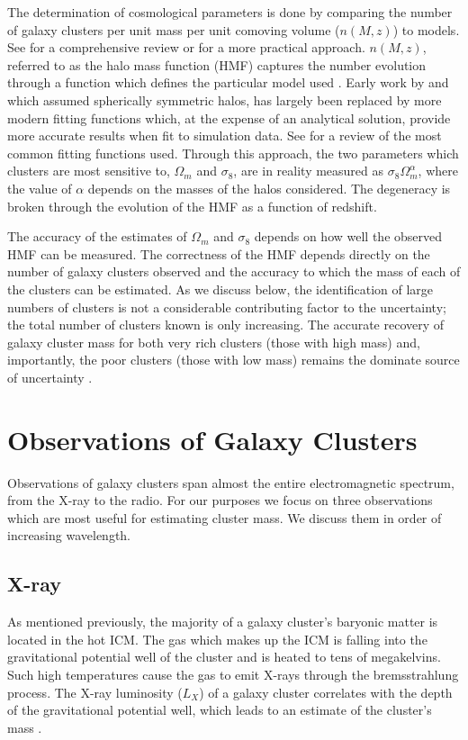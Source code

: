 The determination of cosmological parameters is done by comparing the number of galaxy clusters per unit mass per unit comoving volume ($n(M,z)$) to models. See \cite{Allen2011} for a comprehensive review or \cite{Murray2013} for a more practical approach. $n(M,z)$, referred to as the halo mass function (HMF) captures the number evolution through a function which defines the particular model used . Early work by \cite{Press1974} and \cite{Bond1991} which assumed spherically symmetric halos, has largely been replaced by more modern fitting functions which, at the expense of an analytical solution, provide more accurate results when fit to simulation data. See \cite{Murray2013} for a review of the most common fitting functions used. Through this approach, the two parameters which clusters are most sensitive to, $\Omega_m$ and $\sigma_8$, are in reality measured as $\sigma_8\Omega_m^\alpha$, where the value of $\alpha$ depends on the masses of the halos considered. The degeneracy is broken through the evolution of the HMF as a function of redshift. 

The accuracy of the estimates of $\Omega_m$ and $\sigma_8$ depends on how well the observed HMF can be measured. The correctness of the HMF depends directly on the number of galaxy clusters observed and the accuracy to which the mass of each of the clusters can be estimated. As we discuss below, the identification of large numbers of clusters is not a considerable contributing factor to the uncertainty; the total number of clusters known is only increasing. The accurate recovery of galaxy cluster mass for both very rich clusters (those with high mass) and, importantly, the poor clusters (those with low mass) remains the dominate source of uncertainty .

\section{Observations of Galaxy Clusters}
Observations of galaxy clusters span almost the entire electromagnetic spectrum, from the X-ray to the radio. For our purposes we focus on three observations which are most useful for estimating cluster mass. We discuss them in order of increasing wavelength.

\subsection{X-ray}
As mentioned previously, the majority of a galaxy cluster's baryonic matter is located in the hot ICM. The gas which makes up the ICM is falling into the gravitational potential well of the cluster and is heated to tens of megakelvins. Such high temperatures cause the gas to emit X-rays through the bremsstrahlung process. The X-ray luminosity ($L_X$) of a galaxy cluster correlates with the depth of the gravitational potential well, which leads to an estimate of the cluster's mass . 

